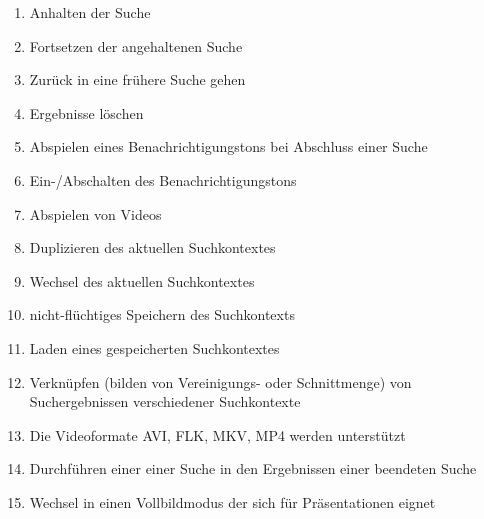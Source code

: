 \begin{enumerate} [label=\bfseries /F \arabic*0/]
	\subsection{Wunsch}
	\item Anhalten der Suche
	\item Fortsetzen der angehaltenen Suche
	\item Zurück in eine frühere Suche gehen %
	\item Ergebnisse löschen %
	\item Abspielen eines Benachrichtigungstons bei Abschluss einer Suche
	\item Ein-/Abschalten des Benachrichtigungstons
	\item Abspielen von Videos
	\item Duplizieren des aktuellen Suchkontextes
	\item Wechsel des aktuellen Suchkontextes
	\item nicht-fl\"uchtiges Speichern des Suchkontexts
	\item Laden eines gespeicherten Suchkontextes
	\item Verkn\"upfen (bilden von Vereinigungs- oder Schnittmenge) von Suchergebnissen verschiedener Suchkontexte
	\item Die Videoformate AVI, FLK, MKV, MP4 werden unterst\"utzt
	\item Durchführen einer einer Suche in den Ergebnissen einer beendeten Suche
	\item Wechsel in einen Vollbildmodus der sich für Präsentationen eignet
\end{enumerate}
